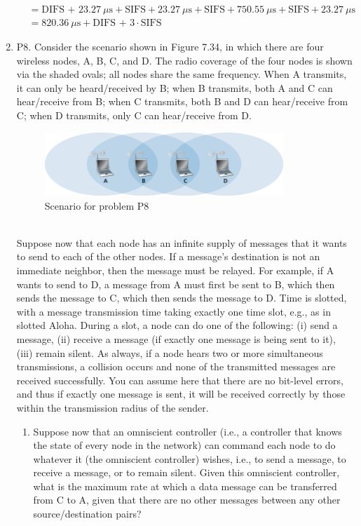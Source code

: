 \documentclass[12pt]{article}
\begin{document}
\begin{enumerate}
\begin{align*}
		&=\text{DIFS + }23.27\ \mu \text{s}+\text{SIFS}+23.27\ \mu \text{s}+\text{SIFS}+750.55\ \mu \text{s}+\text{SIFS}+23.27\ \mu \text{s}\\
		&=820.36\ \mu \text{s}+ \text{DIFS + }3\cdot \text{SIFS}
	\end{align*}
	\item P8. Consider the scenario shown in Figure 7.34, in which there are four wireless nodes, A, B, C, and D. The radio coverage of the four nodes is shown via the shaded ovals; all nodes share the same frequency. When A transmits, it can only be heard/received by B; when B transmits, both A and C can hear/receive from B; when C transmits, both B and D can hear/receive from C; when D transmits, only C can hear/receive from D.
	\setcounter{figure}{33}
		\begin{figure}[h!]
		\centering
		\includegraphics[width=0.85\textwidth]{./Images/Fig07-031.png}
		\caption{Scenario for problem P8}
		\end{figure}\\
		Suppose now that each node has an infinite supply of messages that it wants to send to each of the other nodes. If a message’s destination is not an immediate neighbor, then the message must be relayed. For example, if A wants to send to D, a message from A must first be sent to B, which then sends the message to C, which then sends the message to D. Time is slotted, with a message transmission time taking exactly one time slot, e.g., as in slotted Aloha. During a slot, a node can do one of the following: (i) send a message, (ii) receive a message (if exactly one message is being sent to it), (iii) remain silent. As always, if a node hears two or more simultaneous transmissions, a collision occurs and none of the transmitted messages are received successfully. You can assume here that there are no bit-level errors, and thus if exactly one message is sent, it will be received correctly by those within the transmission radius of the sender.
	\begin{enumerate}
		\item Suppose now that an omniscient controller (i.e., a controller that knows the state of every node in the network) can command each node to do whatever it (the omniscient controller) wishes, i.e., to send a message, to receive a message, or to remain silent. Given this omniscient controller, what is the maximum rate at which a data message can be transferred from C to A, given that there are no other messages between any other source/destination pairs?

\end{enumerate}
\end{enumerate}
\end{document}
